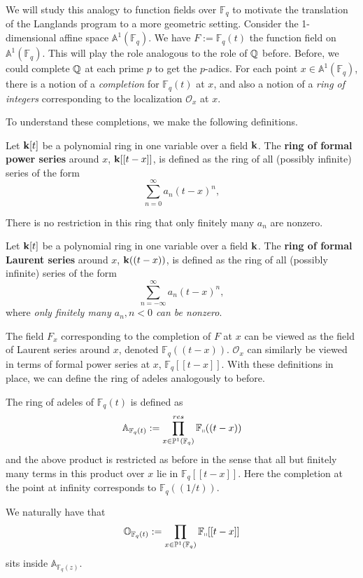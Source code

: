 We will study this analogy to function fields over $\mathbb F_q$ to motivate the translation of the Langlands program to a more geometric setting. Consider the 1-dimensional affine space $\mathbb A^1 (\mathbb F_q)$. We have $F := \mathbb F_q(t)$ the function field on $\mathbb A^1 (\mathbb F_q)$. This will play the role analogous to the role of $\mathbb{Q}$ before. Before, we could complete $\mathbb{Q}$ at each prime $p$ to get the $p$-adics. For each point $x \in \mathbb A^1 (\mathbb F_q)$, there is a notion of a \emph{completion} for $\mathbb F_q(t)$ at $x$, and also a notion of a \emph{ring of integers} corresponding to the localization $\mathcal O_x$ at $x$.

To understand these completions, we make the following definitions.
\begin{defn}
	Let $\mathbf{k}[t]$ be a polynomial ring in one variable over a field $\mathbf{k}$. The \textbf{ring of formal power series} around $x$, $\mathbf{k}[[t-x]]$, is defined as the ring of all (possibly infinite) series of the form
	\[
		\sum_{n=0}^\infty a_n (t-x)^n,
	\]
\end{defn}
\begin{nb}
	There is no restriction in this ring that only finitely many $a_n$ are nonzero. 
\end{nb}

\begin{defn}
	Let $\mathbf{k}[t]$ be a polynomial ring in one variable over a field $\mathbf{k}$. The \textbf{ring of formal Laurent series} around $x$, $\mathbf{k}((t-x))$, is defined as the ring of all (possibly infinite) series of the form
	\[
		\sum_{n=-\infty}^\infty a_n (t-x)^n,
	\]
	where \emph{only finitely many $a_n, n<0$ can be nonzero}.
\end{defn}

The field $F_x$ corresponding to the completion of $F$ at $x$ can be viewed as the field of Laurent series around $x$, denoted $\mathbb F_q((t-x))$. $\mathcal O_x$ can similarly be viewed in terms of formal power series at $x$, $\mathbb F_q [[t-x]]$. With these definitions in place, we can define the ring of adeles analogously to before.

\begin{defn}
	The ring of adeles of $\mathbb F_q(t)$ is defined as 
	\[
		\mathbb A_{\mathbb F_q(t)} := \prod_{x \in \mathbb P^1(\mathbb F_q)}^{res} \mathbb {\mathbb{F}_q}((t-x))
	\]
	and the above product is restricted as before in the sense that all but finitely many terms in this product over $x$ lie in $\mathbb F_q [[t-x]]$. Here the completion at the point at infinity corresponds to $\mathbb F_q ((1/t))$.
\end{defn}
We naturally have that 
\[
	\mathbb O_{\mathbb F_q(t)} := 	\prod_{x \in \mathbb P^1(\mathbb F_q)} \mathbb {\mathbb{F}_q}[[t-x]]
\]
sits inside $\mathbb A_{\mathbb F_q(z)}$.

